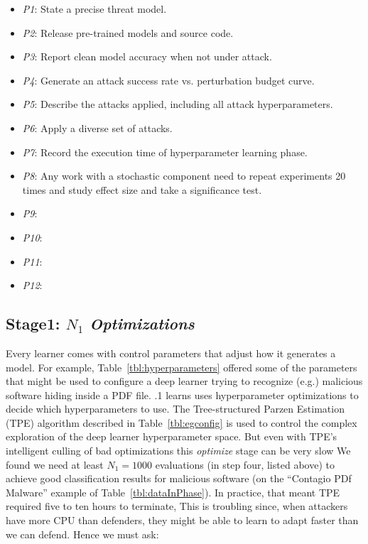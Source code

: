 \documentclass{NSF}
\newenvironment{myitemize}
{ \begin{itemize}[topsep=0pt,bottomsep=0pt,itemsep=0,leftmargin=*]
    \setlength{\itemsep}{0pt}
    \setlength{\parskip}{0pt}
    \setlength{\parsep}{0pt}     }
{ \end{itemize}                  }
\newcommand{\bi}{\begin{myitemize}}
\newcommand{\ei}{\end{myitemize}}
\newcommand{\tbl}[1]{Table~\ref{tbl:#1}}
\newcommand{\IT}{{\sffamily {\em MASS~CONFUSION}}}
\begin{document}
\begin{nsfdescription}
\bi
\item \textit{P1}: State a precise threat model.
\item \textit{P2}: Release pre-trained models and source code.
\item \textit{P3}: Report clean model accuracy when not under attack.
\item \textit{P4}: Generate an attack success rate vs. perturbation budget curve.
\item \textit{P5}: Describe the attacks applied, including all attack hyperparameters.
\item \textit{P6}: Apply a diverse set of attacks.
\item \textit{P7}: Record the execution time of hyperparameter learning phase.
\item \textit{P8}: Any work with a stochastic component need to repeat experiments 20 times and study effect size and take a significance test.
\item \textit{P9}:
\item \textit{P10}:
\item \textit{P11}:
\item \textit{P12}:
\ei


\subsection{Stage1: $N_1$ {\em Optimizations}}
 
 
  
Every learner comes with control parameters that adjust how it generates a model.
For example, \tbl{hyperparameters} offered some of the parameters that might be used to configure a deep learner trying to recognize (e.g.)
malicious software hiding inside a PDF file.
{\IT}.1 learns uses hyperparameter optimizations 
to decide which hyperparameters to use.
The Tree-structured Parzen Estimation (TPE) algorithm
described in \tbl{egconfig}
is   used to control the complex exploration of the deep learner hyperparameter space.
But even with TPE's intelligent culling of bad optimizations  this {\em optimize} stage can be very slow
We found we need at least $N_1=1000$ evaluations
(in step four, listed above) to achieve good 
classification results for malicious software
 (on the ``Contagio PDf Malware'' example of
 Table~\ref{tbl:dataInPhase}).
In practice, that meant TPE required five to ten hours to terminate, This is troubling since, when  attackers have more CPU than   defenders, they might be able to learn to adapt faster
than we can defend. Hence we  must ask:


\end{nsfdescription}
\end{document}
